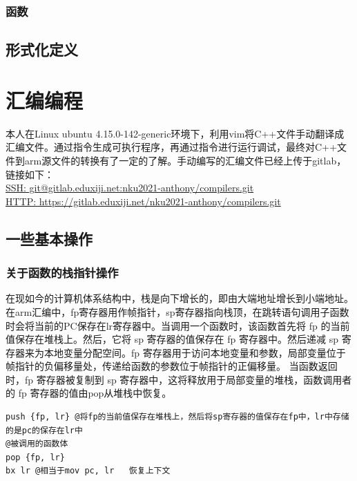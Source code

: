 \documentclass[UTF8,a4paper,10pt]{ctexart}
\begin{document}
\subsubsection{函数}
\subsection{形式化定义}
\newpage
\section{汇编编程}
本人在Linux ubuntu 4.15.0-142-generic环境下，利用vim将C++文件手动翻译成汇编文件。通过指令生成可执行程序，再通过指令进行运行调试，最终对C++文件到arm源文件的转换有了一定的了解。手动编写的汇编文件已经上传于gitlab，链接如下：\\
\href{git@gitlab.eduxiji.net:nku2021-anthony/compilers.git}{SSH: git@gitlab.eduxiji.net:nku2021-anthony/compilers.git}\\
\href{https://gitlab.eduxiji.net/nku2021-anthony/compilers.git}{HTTP:  https://gitlab.eduxiji.net/nku2021-anthony/compilers.git}
\subsection{一些基本操作}
\subsubsection{关于函数的栈指针操作}
在现如今的计算机体系结构中，栈是向下增长的，即由大端地址增长到小端地址。在arm汇编中，fp寄存器用作帧指针，sp寄存器指向栈顶，在跳转语句调用子函数时会将当前的PC保存在lr寄存器中。当调用一个函数时，该函数首先将 fp 的当前值保存在堆栈上。然后，它将 sp 寄存器的值保存在 fp 寄存器中。然后递减 sp 寄存器来为本地变量分配空间。fp 寄存器用于访问本地变量和参数，局部变量位于帧指针的负偏移量处，传递给函数的参数位于帧指针的正偏移量。
当函数返回时，fp 寄存器被复制到 sp 寄存器中，这将释放用于局部变量的堆栈，函数调用者的 fp 寄存器的值由pop从堆栈中恢复。\cite{zhn}
\begin{lstlisting}[title = 函数被调用时的基本框架]
push {fp, lr} @将fp的当前值保存在堆栈上，然后将sp寄存器的值保存在fp中，lr中存储的是pc的保存在lr中
@被调用的函数体
pop {fp, lr} 
bx lr @相当于mov pc, lr   恢复上下文

\end{lstlisting}
\end{document}
